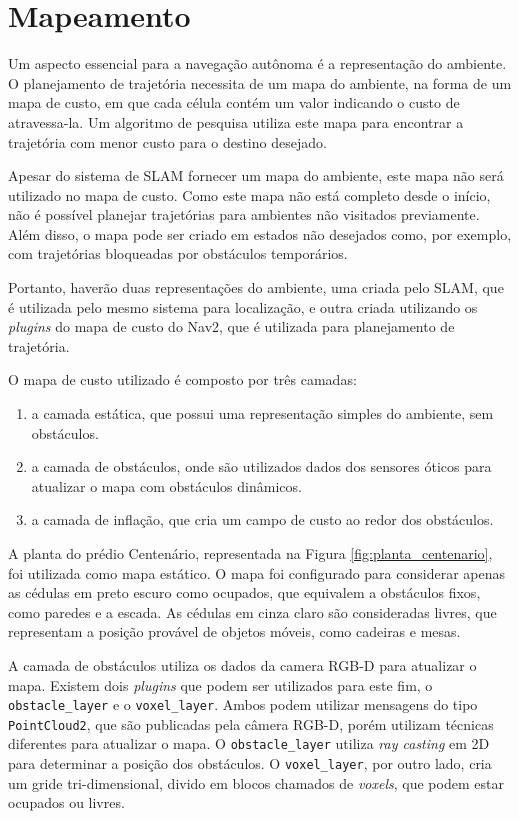 \documentclass[repeatfields,xlists,xpacks,oneside,yearsonly]{ufrgscca}
\begin{document}
\section{Mapeamento}

Um aspecto essencial para a navegação autônoma é a representação do ambiente.
O planejamento de trajetória necessita de um mapa do ambiente, na forma
de um mapa de custo, em que cada célula contém um valor indicando o custo
de atravessa-la. Um algoritmo de pesquisa utiliza este mapa para encontrar
a trajetória com menor custo para o destino desejado.

Apesar do sistema de SLAM fornecer um mapa do ambiente, este mapa não será
utilizado no mapa de custo. Como este mapa não está completo desde o início,
não é possível planejar trajetórias para ambientes não visitados previamente.
Além disso, o mapa pode ser criado em estados não desejados como,
por exemplo, com trajetórias bloqueadas por obstáculos temporários.

Portanto, haverão duas representações do ambiente, uma criada pelo SLAM, que 
é utilizada pelo mesmo sistema para localização, e outra criada utilizando
os \textit{plugins} do mapa de custo do Nav2, que é utilizada para planejamento
de trajetória.

O mapa de custo utilizado é composto por três camadas: 
\begin{enumerate}
    \item a camada estática, que possui uma representação simples do ambiente,
     sem obstáculos.
    \item a camada de obstáculos, onde são utilizados dados dos sensores óticos
    para atualizar o mapa com obstáculos dinâmicos.
    \item a camada de inflação, que cria um campo de custo ao redor dos obstáculos.
\end{enumerate}

A planta do prédio Centenário, representada na Figura \ref{fig:planta_centenario},
foi utilizada como mapa estático. O mapa foi configurado para considerar apenas as 
cédulas em preto escuro como ocupados, que equivalem a obstáculos fixos, como paredes
e a escada. As cédulas em cinza claro são consideradas livres, que representam a posição 
provável de objetos móveis, como cadeiras e mesas.

A camada de obstáculos utiliza os dados da camera RGB-D para atualizar o mapa.
Existem dois \textit{plugins} que podem ser utilizados para este fim, o
\texttt{obstacle\_layer} e o \texttt{voxel\_layer}.
Ambos podem utilizar mensagens do tipo \texttt{PointCloud2}, que são publicadas
pela câmera RGB-D, porém utilizam técnicas diferentes para atualizar o mapa.
O \texttt{obstacle\_layer} utiliza \textit{ray casting} em 2D para 
determinar a posição dos obstáculos. 
O \texttt{voxel\_layer}, por outro lado, cria um gride tri-dimensional, 
divido em blocos chamados de \textit{voxels}, que podem estar ocupados ou livres.
\end{document}

